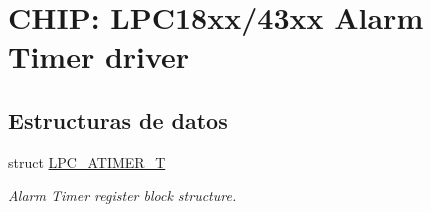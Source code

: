 \hypertarget{group___a_t_i_m_e_r__18_x_x__43_x_x}{}\section{C\+H\+IP\+: L\+P\+C18xx/43xx Alarm Timer driver}
\label{group___a_t_i_m_e_r__18_x_x__43_x_x}
\subsection*{Estructuras de datos}
\begin{DoxyCompactItemize}
\item 
struct \hyperlink{struct_l_p_c___a_t_i_m_e_r___t}{L\+P\+C\+\_\+\+A\+T\+I\+M\+E\+R\+\_\+T}
\begin{DoxyCompactList}\small\item\em Alarm Timer register block structure. \end{DoxyCompactList}\end{DoxyCompactItemize}
